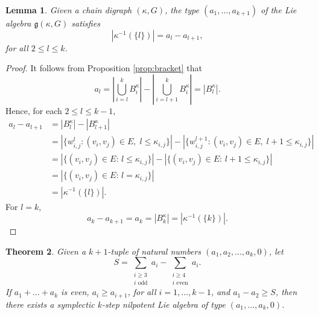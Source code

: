\documentclass[a4paper,11pt]{amsart}
\newtheorem{theorem}{Theorem}[section]
\newtheorem{lemma}[theorem]{Lemma}
\theoremstyle{definition}
\theoremstyle{remark}
\numberwithin{equation}{section}
\newcommand{\g}{\mathfrak{g}}
\begin{document}
\begin{lemma}\label{lm:typ}
Given a chain digraph \((\kappa,G)\), the type $(a_1,\dots,a_{k+1})$ of the Lie algebra $\g(\kappa,G)$ satisfies
\[
|\kappa^{-1}(\{l\})|=a_{l}-a_{l+1},
\]
 for all \(2\leq l\leq k\).
\end{lemma}

\begin{proof}
It follows from Proposition \ref{prop:bracket} that
\[a_l=|\bigcup_{i=l}^k B_{i}^\kappa|-|\bigcup_{i=l+1}^k B_{i}^\kappa|=|B_l^\kappa|. \] 
Hence, for each $2\le l\le k-1$, 
\begin{align*}
a_l-a_{l+1}&=|B_l^\kappa|-|B_{l+1}^\kappa|\\
&=|\{w_{i,j}^l: (v_i,v_j)\in E,\; l\leq \kappa_{i,j} \}|-|\{w_{i,j}^{l+1}: (v_i,v_j)\in E,\;l+1\leq \kappa_{i,j} \}|\\
&=|\{(v_i,v_j)\in E :\, l\leq \kappa_{i,j} \}|-|\{(v_i,v_j)\in E :\, l+1\leq \kappa_{i,j} \}|\\
&=|\{(v_i,v_j)\in E :\, l= \kappa_{i,j} \}|\\
&=|\kappa^{-1}(\{l\})|.
\end{align*}
For $l=k$, $$a_k-a_{k+1}=a_k=|B_k^\kappa|=|\kappa^{-1}(\{k\})|.$$
\end{proof}

\begin{theorem}\label{thm:type}
Given a $k+1$-tuple of natural numbers $(a_1, a_2, \dots, a_k,0)$, let 
\[ S=\sum_{\substack{i\ge 3 \\ i \text{ odd}}}a_i - \sum_{\substack{i\ge 4 \\ i \text{ even}}}a_i. \] 
If $a_1+\dots + a_k$ is even, $a_i \geq a_{i+1}$, for all $i=1,\dots,k-1$, and $a_1-a_2\geq S$,
then there exists a symplectic $k$-step nilpotent Lie algebra of type \((a_1,\dots,a_k,0)\).
\end{theorem}
\end{document}
